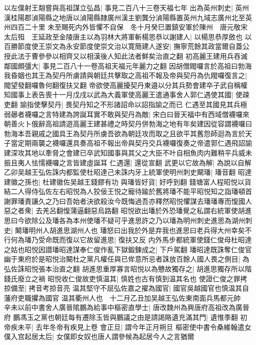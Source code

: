 以左僕射王翷嘗與高祖謀立弘昌|{
	事見二百八十三卷天福七年}
出為英州刺史|{
	英州漢桂陽郡湞陽縣之地唐以湞陽縣隸廣州漢主劉龔分湞陽縣置英州九域志廣州北至英州四百二十里}
未至賜死内外皆懼不自保　冬十月癸巳置鎮安軍於陳州　唐元敬宋太后殂　王延政至金陵唐主以為羽林大將軍斬楊思恭以謝建人|{
	以楊思恭厚斂也}
以百勝節度使王崇文為永安節度使崇文治以寛簡建人遂安|{
	撫寧荒餘其政當爾自蓋公授此法于曹參參以相齊又以相漢後人知此法者鮮矣治直之翻}
初高麗王建用兵吞滅鄰國頗彊大|{
	事見二百八十一卷高祖天福元年麗力之翻}
因胡僧閥囉言於高祖曰勃海我昏姻也其王為契丹所虜請與朝廷共擊取之高祖不報及帝與契丹為仇閥囉復言之|{
	閥望發翻囉魯何翻復扶又翻}
帝欲使高麗擾契丹東邉以分其兵勢會建卒子武自稱權知國事上表告喪十一月戊戌以武為大義軍使高麗王遣通事舍人郭仁遇使其國|{
	使疎吏翻}
諭指使擊契丹|{
	畏契丹知之不形諸詔命以詔指諭之而已}
仁遇至其國見其兵極弱曏者襪囉之言特建為誇誕耳實不敢與契丹為敵|{
	宋白曰晉天福中有西域僧襪囉來朝善火卜俄辭高祖請遊高麗王建甚禮之時契丹併勃海之地有年矣建因從容謂襪囉曰勃海本吾親戚之國具王為契丹所虜吾欲為朝廷攻而取之且欲平其舊怨師迴為言於天子當定期兩襲之襪囉還具奏高祖不報出帝與契丹交兵襪囉復奏之帝遣郭仁遇飛詔諭建深攻其地以牽脅之會建已卒武知國事與其父之大臣不叶自相魚肉内難稍平兵威未振且夷人怯懦襪囉之言皆建虛誕耳}
仁遇還|{
	還從宣翻}
武更以它故為解|{
	為說以自解}
乙卯吴越王弘佐誅内都監使杜昭達己未誅内牙上統軍使明州刺史闞璠|{
	璠音翻}
昭達建徽之孫也|{
	杜建徽佐吴越王錢鏐有功}
與璠皆好貨|{
	好呼到翻}
錢塘富人程昭悦以貨結二人得侍弘佐左右昭悦為人狡佞王悦之寵待踰於舊將璠不能平昭悦知之詣璠頓首謝罪璠責讓久之乃曰吾始者決欲殺汝今既悔過吾亦釋然昭悦懼謀去璠璠專而愎國人惡之者衆|{
	去羌呂翻愎蒲逼翻惡烏路翻}
昭悦欲出璠於外恐璠覺之私謂右統軍使胡進思曰今欲除公及璠各為本州使璠不疑可乎進思許之乃以璠為明州刺史進思為湖州刺史|{
	闞璠明州人胡進思湖州人也}
璠怒曰出我於外是弃我也進思曰老兵得大州幸矣不行何為璠乃受命既而復以它故留進思|{
	復扶又反}
内外馬步都統軍使錢仁俊母杜昭達之姑也昭悦因譛璠昭達謀奉仁俊作亂下獄鍛鍊成之|{
	下戶駕翻}
璠昭達既誅奪仁俊官幽于東府於是昭悦治闞杜之黨凡權任與已侔意所忌者誅放百餘人國人畏之側目|{
	為弘佐誅昭悦張本治直之翻}
胡進思重厚寡言昭悦以為戇故獨存之|{
	胡進思獨存所以階錢氏廢立之禍}
昭悦收仁俊故吏慎温其|{
	慎姓也古有慎到温其名也}
使證仁俊之罪拷掠備至|{
	拷音考掠音亮}
温其堅守不屈弘佐嘉之擢為國官|{
	國官吳越國官也慎温其自藩府吏職㩴為國官}
温其衢州人也　十二月乙丑加吴越王弘佐東南面兵馬都元帥　辛未以前中書舍人廣晉隂鵬為給事中樞密直學士|{
	唐改魏州為興唐府高祖改為廣晉府}
鵬馮玉之黨也朝廷每有遷除玉皆與鵬議之由是請謁賂遺充滿其門|{
	遺惟季翻}
初帝疾未平|{
	去年冬帝有疾見上卷}
會正旦|{
	謂今年正月朔旦}
樞密使中書令桑維翰遣女僕入宫起居太后|{
	女僕即女奴也唐人謂參候為起居今人之言猶爾}
